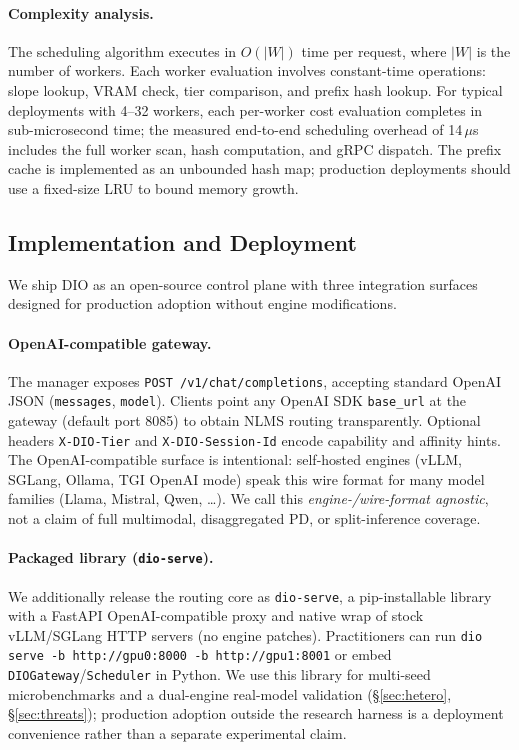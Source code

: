 \documentclass[10pt,twocolumn,letterpaper]{article}
\begin{document}
\paragraph{Complexity analysis.}
The scheduling algorithm executes in $O(|W|)$ time per request, where $|W|$ is the number of workers. Each worker evaluation involves constant-time operations: slope lookup, VRAM check, tier comparison, and prefix hash lookup. For typical deployments with 4--32 workers, each per-worker cost evaluation completes in sub-microsecond time; the measured end-to-end scheduling overhead of 14\,$\mu$s includes the full worker scan, hash computation, and gRPC dispatch. The prefix cache is implemented as an unbounded hash map; production deployments should use a fixed-size LRU to bound memory growth.

\subsection{Implementation and Deployment}
\label{sec:implementation}

We ship DIO as an open-source control plane with three integration surfaces designed for production adoption without engine modifications.

\paragraph{OpenAI-compatible gateway.}
The manager exposes \texttt{POST /v1/chat/completions}, accepting standard OpenAI JSON (\texttt{messages}, \texttt{model}). Clients point any OpenAI SDK \texttt{base\_url} at the gateway (default port 8085) to obtain NLMS routing transparently. Optional headers \texttt{X-DIO-Tier} and \texttt{X-DIO-Session-Id} encode capability and affinity hints. The OpenAI-compatible surface is intentional: self-hosted engines (vLLM, SGLang, Ollama, TGI OpenAI mode) speak this wire format for many model families (Llama, Mistral, Qwen, \ldots). We call this \emph{engine-/wire-format agnostic}, not a claim of full multimodal, disaggregated PD, or split-inference coverage.

\paragraph{Packaged library (\texttt{dio-serve}).}
We additionally release the routing core as \texttt{dio-serve}, a pip-installable library with a FastAPI OpenAI-compatible proxy and native wrap of stock vLLM/SGLang HTTP servers (no engine patches). Practitioners can run \texttt{dio serve -b http://gpu0:8000 -b http://gpu1:8001} or embed \texttt{DIOGateway}/\texttt{Scheduler} in Python. We use this library for multi-seed microbenchmarks and a dual-engine real-model validation (\S\ref{sec:hetero}, \S\ref{sec:threats}); production adoption outside the research harness is a deployment convenience rather than a separate experimental claim.
\end{document}
